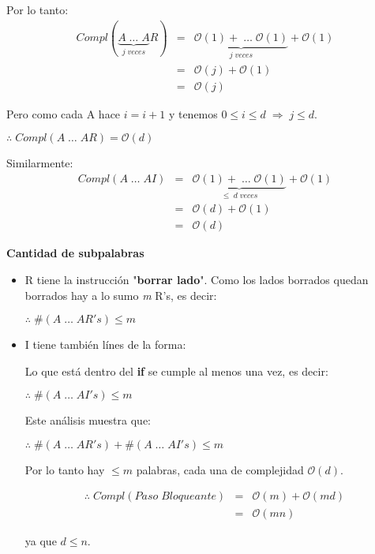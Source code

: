 \documentclass[12pt,a4paper]{report}
\begin{document}
		Por lo tanto:
		\begin{eqnarray}
			\nonumber Compl(\underbrace{A \; \dotsc \; A}_{j \; veces}R) & = & \underbrace{\mathcal{O}(1) + \; \dotsc \; \mathcal{O}(1)}_{j \; veces} + \mathcal{O}(1) \\
			\nonumber & = & \mathcal{O}(j) + \mathcal{O}(1) \\
			\nonumber & = & \mathcal{O}(j)
		\end{eqnarray}

		Pero como cada A hace $ i = i+1$ y tenemos $ 0 \leq \textit{i} \leq \textit{d} \; \Rightarrow \; \textit{j} \leq \textit{d}.$

		\begin{center}
			$\therefore \; Compl(A \; \dotsc \; AR) = \mathcal{O}(\textit{d})$
		\end{center}

		Similarmente:
		\begin{eqnarray}
			\nonumber Compl(A \; \dotsc \; AI) & = & \underbrace{\mathcal{O}(1) + \; \dotsc \; \mathcal{O}(1)}_{\leq \; d \; veces} + \mathcal{O}(1) \\
			\nonumber & = & \mathcal{O}(d) + \mathcal{O}(1) \\
			\nonumber & = & \mathcal{O}(d)
		\end{eqnarray}

		\textbf{Cantidad de subpalabras}
		\begin{itemize}
			\item R tiene la instrucción "\textbf{borrar lado}". Como los lados borrados quedan borrados hay a lo sumo \textit{m} R's, es decir:
			\begin{center}
				$ \therefore \; \# (A \; \dotsc \; AR's) \leq m $
			\end{center}

			\item I tiene también línes de la forma:

			 	Lo que está dentro del \textbf{if} se cumple al menos una vez, es decir:
			 	\begin{center}
					$ \therefore \; \# (A \; \dotsc \; AI's) \leq m $
				\end{center}

			Este análisis muestra que:
			\begin{center}
					$ \therefore \; \# (A \; \dotsc \; AR's) + \# (A \; \dotsc \; AI's) \leq m $
				\end{center}

			Por lo tanto hay $\leq m$ palabras, cada una de complejidad $\mathcal{O}(d)$.

			\begin{eqnarray}
			\nonumber \therefore \;  Compl(Paso \; Bloqueante) & = & \mathcal{O}(m) + \mathcal{O}(md) \\
			\nonumber & = & \mathcal{O}(mn)
		\end{eqnarray}

		ya que $d \leq n$.
		\end{itemize}
\end{document}
